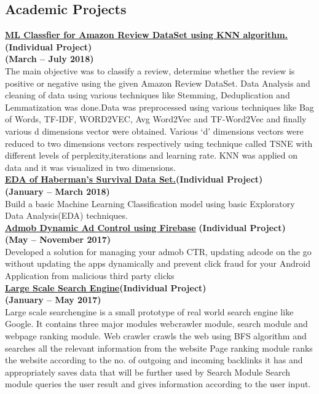 \documentclass[margin,line]{res}
\begin{document}
\begin{resume}
\section{\sc Academic Projects}

{\bf  \href{https://github.com/sagunesh/Machine-Learning-and-Data-Science/tree/master/KNN\%20on\%20Amazon\%20Review\%20Data\%20Set}{ ML Classfier  for  Amazon Review DataSet using KNN algorithm.}}\hfill {\bf(Individual Project)}\\{\bf(March  --  July 2018)}\\
The main objective was to classify a review, determine whether the review is positive or negative using the given Amazon Review DataSet. Data Analysis and cleaning of data using various techniques like Stemming, Deduplication and  Lemmatization was done.Data was preprocessed  using various techniques like  Bag of Words, TF-IDF, WORD2VEC, Avg Word2Vec and TF-Word2Vec and finally various d dimensions vector were obtained. Various `d' dimensions vectors were reduced to two dimensions vectors respectively using  technique called  TSNE with different levels of perplexity,iterations and learning rate. KNN was applied on  data and it was visualized in two dimensions.\\


{\bf  \href{https://www.kaggle.com/saguneshgrover/habermans-survival-data-set-eda/notebook}{EDA of  Haberman's Survival Data Set.}}\hfill {\bf(Individual Project)}\\{\bf (January -- March 2018)}\\
Build a basic Machine Learning Classification  model using basic Exploratory Data Analysis(EDA)  techniques.\\

{\bf \href{https://github.com/sagunesh/Admob-Ad-Control} {Admob Dynamic Ad Control using Firebase}} \hfill {\bf(Individual Project)}\\{\bf (May -- November 2017)}\\
Developed a solution for managing your admob CTR, updating adcode on the go without updating the apps dynamically and prevent click fraud for your Android Application from malicious third party clicks\\

{\bf  \href{https://github.com/sagunesh/Large-Scale-Search-Engine}{ Large Scale Search Engine}}\hfill{\bf(Individual Project)}\\{\bf (January -- May 2017)}\\
Large scale searchengine is a small prototype of real world search engine like Google. It contains three major modules 
webcrawler module, search module and webpage ranking module.
Web crawler crawls the web using BFS algorithm and searches all the relevant information  from the website 
Page ranking module ranks the website according to the no. of outgoing and incoming backlinks it has and appropriately saves data that will be further used by Search Module
Search module queries the user result and gives information according to the user input.\\\\


\end{resume}
\end{document}
